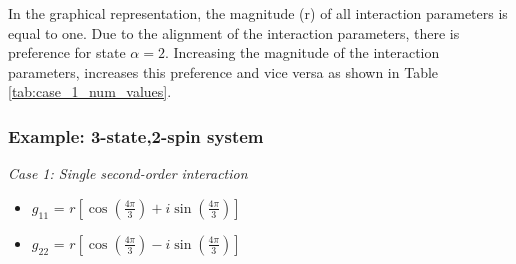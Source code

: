 \noindent
In the graphical representation, the magnitude (r) of all interaction parameters is equal to one. Due to the alignment of the interaction parameters, there is preference for state $\alpha = 2$.
Increasing the magnitude of the interaction parameters, increases this preference and vice versa as shown in Table \ref{tab:case_1_num_values}. 

\subsubsection{Example: 3-state,2-spin system}

\noindent
\textit{Case 1: Single second-order interaction}

\begin{itemize}
    \item $g_{11}$ = $r\left[\cos\left( \frac{4\pi}{3}\right) + i \sin\left( \frac{4\pi}{3}\right)\right]$
    \item $g_{22}$ = $r\left[\cos\left( \frac{4\pi}{3}\right) - i \sin\left( \frac{4\pi}{3}\right)\right]$
\end{itemize}

